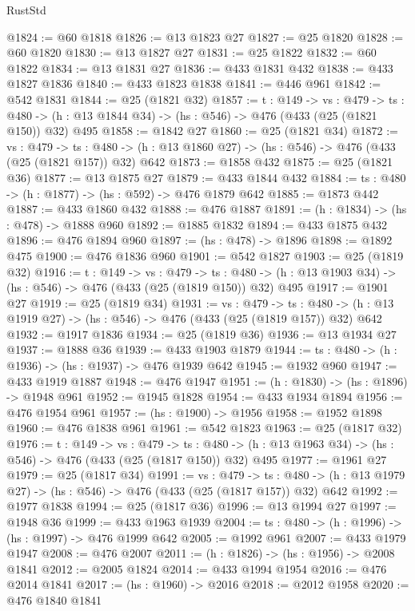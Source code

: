 \begin{lexlean}{RustStd}
\begin{coremodule}
@1824 := @60 @1818
@1826 := @13 @1823 @27
@1827 := @25 @1820
@1828 := @60 @1820
@1830 := @13 @1827 @27
@1831 := @25 @1822
@1832 := @60 @1822
@1834 := @13 @1831 @27
@1836 := @433 @1831 @432
@1838 := @433 @1827 @1836
@1840 := @433 @1823 @1838
@1841 := @446 @961
@1842 := @542 @1831
@1844 := @25 (@1821 @32)
@1857 := {t : @149} ->
  {vs : @479} ->
  {ts : @480} -> (h : @13 @1844 @34) -> (hs : @546) -> @476 (@433 (@25 (@1821 @150)) @32) @495
@1858 := @1842 @27
@1860 := @25 (@1821 @34)
@1872 := {vs : @479} ->
  {ts : @480} -> (h : @13 @1860 @27) -> (hs : @546) -> @476 (@433 (@25 (@1821 @157)) @32) @642
@1873 := @1858 @432
@1875 := @25 (@1821 @36)
@1877 := @13 @1875 @27
@1879 := @433 @1844 @432
@1884 := {ts : @480} -> (h : @1877) -> (hs : @592) -> @476 @1879 @642
@1885 := @1873 @442
@1887 := @433 @1860 @432
@1888 := @476 @1887
@1891 := (h : @1834) -> (hs : @478) -> @1888 @960
@1892 := @1885 @1832
@1894 := @433 @1875 @432
@1896 := @476 @1894 @960
@1897 := (hs : @478) -> @1896
@1898 := @1892 @475
@1900 := @476 @1836 @960
@1901 := @542 @1827
@1903 := @25 (@1819 @32)
@1916 := {t : @149} ->
  {vs : @479} ->
  {ts : @480} -> (h : @13 @1903 @34) -> (hs : @546) -> @476 (@433 (@25 (@1819 @150)) @32) @495
@1917 := @1901 @27
@1919 := @25 (@1819 @34)
@1931 := {vs : @479} ->
  {ts : @480} -> (h : @13 @1919 @27) -> (hs : @546) -> @476 (@433 (@25 (@1819 @157)) @32) @642
@1932 := @1917 @1836
@1934 := @25 (@1819 @36)
@1936 := @13 @1934 @27
@1937 := @1888 @36
@1939 := @433 @1903 @1879
@1944 := {ts : @480} -> (h : @1936) -> (hs : @1937) -> @476 @1939 @642
@1945 := @1932 @960
@1947 := @433 @1919 @1887
@1948 := @476 @1947
@1951 := (h : @1830) -> (hs : @1896) -> @1948 @961
@1952 := @1945 @1828
@1954 := @433 @1934 @1894
@1956 := @476 @1954 @961
@1957 := (hs : @1900) -> @1956
@1958 := @1952 @1898
@1960 := @476 @1838 @961
@1961 := @542 @1823
@1963 := @25 (@1817 @32)
@1976 := {t : @149} ->
  {vs : @479} ->
  {ts : @480} -> (h : @13 @1963 @34) -> (hs : @546) -> @476 (@433 (@25 (@1817 @150)) @32) @495
@1977 := @1961 @27
@1979 := @25 (@1817 @34)
@1991 := {vs : @479} ->
  {ts : @480} -> (h : @13 @1979 @27) -> (hs : @546) -> @476 (@433 (@25 (@1817 @157)) @32) @642
@1992 := @1977 @1838
@1994 := @25 (@1817 @36)
@1996 := @13 @1994 @27
@1997 := @1948 @36
@1999 := @433 @1963 @1939
@2004 := {ts : @480} -> (h : @1996) -> (hs : @1997) -> @476 @1999 @642
@2005 := @1992 @961
@2007 := @433 @1979 @1947
@2008 := @476 @2007
@2011 := (h : @1826) -> (hs : @1956) -> @2008 @1841
@2012 := @2005 @1824
@2014 := @433 @1994 @1954
@2016 := @476 @2014 @1841
@2017 := (hs : @1960) -> @2016
@2018 := @2012 @1958
@2020 := @476 @1840 @1841

\end{coremodule}
\end{lexlean}
